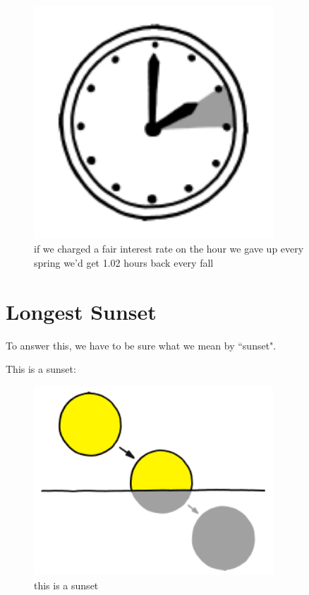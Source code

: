 \begin{figure}[!htbp]
\centering
\includegraphics[scale=0.5, max width=0.8\textwidth]{imgs/a/41/go_west_clock.png}
\caption{if we charged a fair interest rate on the hour we gave up every spring we'd get 1.02 hours back every fall}
\end{figure}

{
\chapter{Longest Sunset}
}

\hfill{}

{To answer this, we have to be sure what we mean by “sunset".}

{This is a sunset:}

\begin{figure}[!htbp]
\centering
\includegraphics[scale=0.5, max width=0.8\textwidth]{imgs/a/42/sunset_yes.png}
\caption{this is a sunset}
\end{figure}

